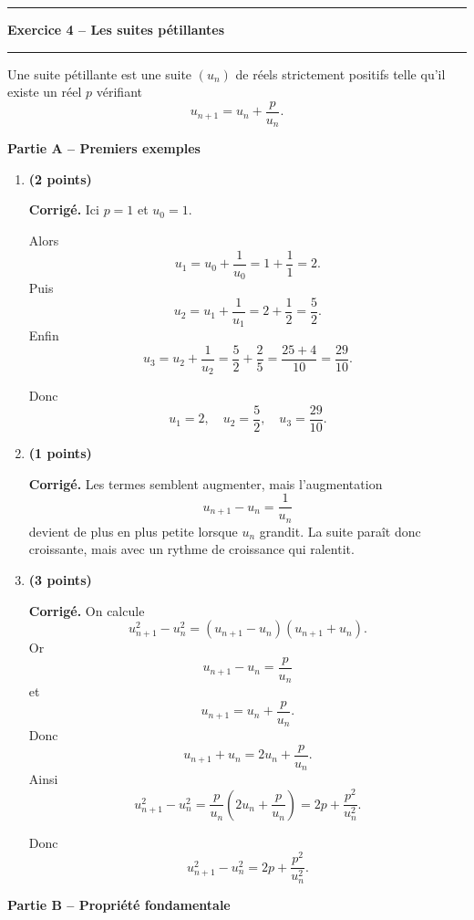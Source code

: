 \documentclass[11pt,a4paper]{article}
\newcommand{\bareme}[1]{\hfill{\color{blue!70!black}\textbf{(#1 points)}}}
\newcommand{\corr}{\noindent\textcolor{blue!70!black}{\textbf{Corrigé. }}}
\begin{document}
\vspace{0.4cm}

\hrule
\vspace{0.4cm}
\begin{center}
    \textbf{\large Exercice 4 -- Les suites pétillantes}
\end{center}
\vspace{0.2cm}
\hrule
\vspace{0.3cm}

Une suite pétillante est une suite $(u_n)$ de réels strictement positifs telle qu’il existe un réel $p$ vérifiant
\[
u_{n+1}=u_n+\frac{p}{u_n}.
\]

\medskip

\textbf{Partie A -- Premiers exemples}

\begin{enumerate}[label=\textbf{A.\arabic*.}, leftmargin=0.9cm]

\item \bareme{2}

\corr Ici $p=1$ et $u_0=1$.

Alors
\[
u_1=u_0+\frac1{u_0}=1+\frac11=2.
\]
Puis
\[
u_2=u_1+\frac1{u_1}=2+\frac12=\frac52.
\]
Enfin
\[
u_3=u_2+\frac1{u_2}=\frac52+\frac{2}{5}=\frac{25+4}{10}=\frac{29}{10}.
\]

Donc
\[
\boxed{u_1=2,\quad u_2=\frac52,\quad u_3=\frac{29}{10}.}
\]

\item \bareme{1}

\corr Les termes semblent augmenter, mais l’augmentation
\[
u_{n+1}-u_n=\frac1{u_n}
\]
devient de plus en plus petite lorsque $u_n$ grandit. La suite paraît donc croissante, mais avec un rythme de croissance qui ralentit.

\item \bareme{3}

\corr On calcule
\[
u_{n+1}^2-u_n^2=(u_{n+1}-u_n)(u_{n+1}+u_n).
\]
Or
\[
u_{n+1}-u_n=\frac{p}{u_n}
\]
et
\[
u_{n+1}=u_n+\frac{p}{u_n}.
\]
Donc
\[
u_{n+1}+u_n=2u_n+\frac{p}{u_n}.
\]
Ainsi
\[
u_{n+1}^2-u_n^2=\frac{p}{u_n}\left(2u_n+\frac{p}{u_n}\right)
=2p+\frac{p^2}{u_n^2}.
\]

Donc
\[
\boxed{u_{n+1}^2-u_n^2=2p+\frac{p^2}{u_n^2}.}
\]

\end{enumerate}

\medskip

\textbf{Partie B -- Propriété fondamentale}
\end{document}
